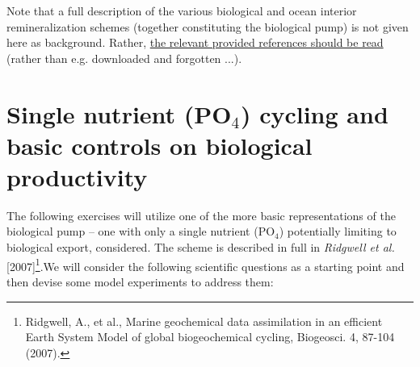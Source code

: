 \documentclass[11pt,fleqn]{book} %
\begin{document}
Note that a full description of the various biological and ocean interior remineralization schemes (together constituting the biological pump) is not given here as background. Rather, \uline{the relevant provided references should be read} (rather than e.g. downloaded and forgotten ...).


\newpage


\section{Single nutrient (PO$_{4}$) cycling and basic controls on biological productivity}

The following exercises  will utilize one of the more basic representations of the biological pump -- one with only a single nutrient (PO$_{4}$) potentially limiting to biological export, considered. The scheme is described in full in \textit{Ridgwell et al.} [2007]\footnote{Ridgwell, A., et al., Marine geochemical data assimilation in an efficient Earth System Model of global biogeochemical cycling, Biogeosci. 4, 87-104 (2007). }.We will consider the following scientific questions as a starting point and then devise some model experiments to address them:
\end{document}
